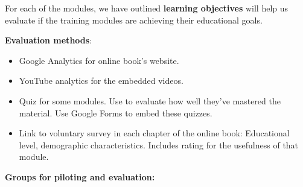 \documentclass[pdftex,english,11pt,parskip=half]{scrartcl}
\begin{document}
For each of the modules, we have outlined \textbf{learning objectives} will help us evaluate if the training modules are achieving their educational goals.

\textbf{Evaluation methods}:

\begin{itemize}
\item Google Analytics for online book's website.
\item YouTube analytics for the embedded videos. 
\item Quiz for some modules. Use to evaluate how well they've mastered the material. Use Google Forms to embed these quizzes.
\item Link to voluntary survey in each chapter of the online book: Educational level, demographic characteristics. Includes rating for the usefulness of that module.
\end{itemize}



\textbf{Groups for piloting and evaluation:}
\end{document}
